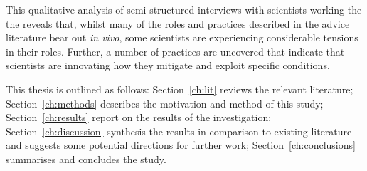 This qualitative analysis of semi-structured interviews with scientists working the the \CAN{} \SPI{} reveals that, whilst many of the roles and practices described in the advice literature bear out \emph{in vivo}, some scientists are experiencing considerable tensions in their roles. Further, a number of practices are uncovered that indicate that scientists are innovating how they mitigate and exploit specific conditions. 

This thesis is outlined as follows: Section~\ref{ch:lit} reviews the relevant literature; Section~\ref{ch:methods} describes the motivation and method of this study; Section~\ref{ch:results} report on the results of the investigation; Section~\ref{ch:discussion} synthesis the results in comparison to existing literature and suggests some potential directions for further work; Section~\ref{ch:conclusions} summarises and concludes the study.


